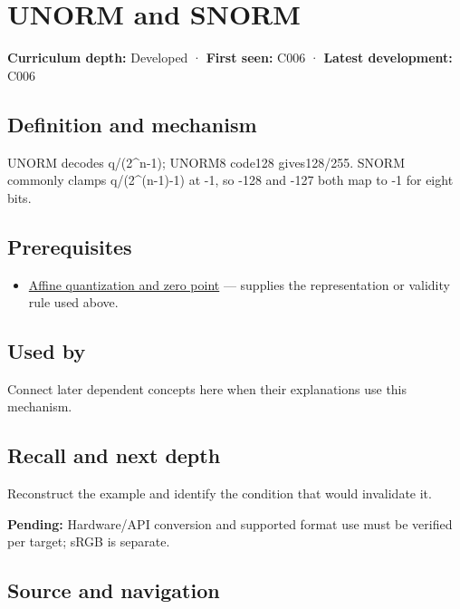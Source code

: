 \hypertarget{appendix-b2402c453dac}{}
\section{UNORM and SNORM}\label{appendix-b2402c453dac-unorm-and-snorm}

\textbf{Curriculum depth:} Developed · \textbf{First seen:} C006 · \textbf{Latest development:} C006

\subsection{Definition and mechanism}\label{appendix-b2402c453dac-definition-and-mechanism}

UNORM decodes q/(2\^{}n-1); UNORM8 code128 gives128/255. SNORM commonly clamps q/(2\^{}(n-1)-1) at -1, so -128 and -127 both map to -1 for eight bits.

\subsection{Prerequisites}\label{appendix-b2402c453dac-prerequisites}

\begin{itemize}
\tightlist
\item
  \hyperref[appendix-d5da3eaabaef]{Affine quantization and zero point} --- supplies the representation or validity rule used above.
\end{itemize}

\subsection{Used by}\label{appendix-b2402c453dac-used-by}

Connect later dependent concepts here when their explanations use this mechanism.

\subsection{Recall and next depth}\label{appendix-b2402c453dac-recall-and-next-depth}

Reconstruct the example and identify the condition that would invalidate it.

\textbf{Pending:} Hardware/API conversion and supported format use must be verified per target; sRGB is separate.

\subsection{Source and navigation}\label{appendix-b2402c453dac-source-and-navigation}

